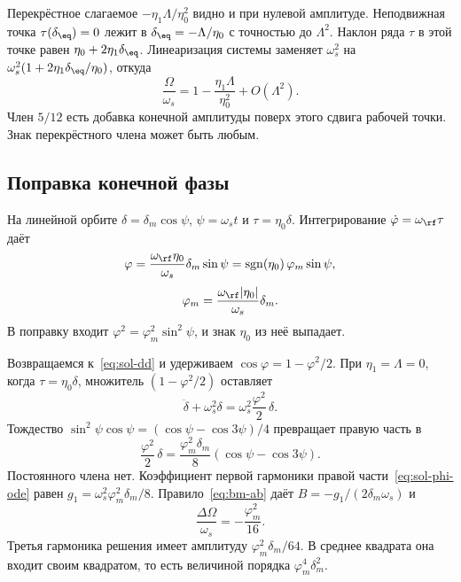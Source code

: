 Перекрёстное слагаемое $-\eta_1\Lambda/\eta_0^2$ видно и при нулевой амплитуде. Неподвижная точка $\tau(\delta_\eq)=0$ лежит в $\delta_\eq=-\Lambda/\eta_0$ с точностью до $\Lambda^2$. Наклон ряда $\tau$ в этой точке равен $\eta_0+2\eta_1\delta_\eq$. Линеаризация системы заменяет $\omega_s^2$ на $\omega_s^2(1+2\eta_1\delta_\eq/\eta_0)$, откуда
\begin{equation}
\label{eq:sol-cross}
\frac{\Omega}{\omega_s}
=1-\frac{\eta_1\Lambda}{\eta_0^2}+O(\Lambda^2).
\end{equation}
Член $5/12$ есть добавка конечной амплитуды поверх этого сдвига рабочей точки. Знак перекрёстного члена может быть любым.

\subsection{Поправка конечной фазы}
\label{sec:sol-phi}

На линейной орбите $\delta=\delta_m\cos\psi$, $\psi=\omega_s t$ и $\tau=\eta_0\delta$. Интегрирование $\dot\varphi=\omega_\rf\tau$ даёт
\begin{equation}
\label{eq:sol-phi}
\varphi
=\frac{\omega_\rf\eta_0}{\omega_s}\delta_m\sin\psi
=\operatorname{sgn}(\eta_0)\,\varphi_m\sin\psi,
\end{equation}
\begin{equation}
\label{eq:sol-phim}
\varphi_m
=\frac{\omega_\rf|\eta_0|}{\omega_s}\delta_m.
\end{equation}
В поправку входит $\varphi^2=\varphi_m^2\sin^2\psi$, и знак $\eta_0$ из неё выпадает.

Возвращаемся к~\eqref{eq:sol-dd} и удерживаем $\cos\varphi=1-\varphi^2/2$. При $\eta_1=\Lambda=0$, когда $\tau=\eta_0\delta$, множитель $(1-\varphi^2/2)$ оставляет
\begin{equation}
\label{eq:sol-phi-ode}
\ddot\delta+\omega_s^2\delta
=\omega_s^2\frac{\varphi^2}{2}\,\delta.
\end{equation}
Тождество $\sin^2\psi\cos\psi=(\cos\psi-\cos 3\psi)/4$ превращает правую часть в
\begin{equation}
\label{eq:sol-phi-fourier}
\frac{\varphi^2}{2}\,\delta
=\frac{\varphi_m^2\delta_m}{8}(\cos\psi-\cos 3\psi).
\end{equation}
Постоянного члена нет. Коэффициент первой гармоники правой части~\eqref{eq:sol-phi-ode} равен $g_1=\omega_s^2\varphi_m^2\delta_m/8$. Правило~\eqref{eq:bm-ab} даёт $B=-g_1/(2\delta_m\omega_s)$ и
\begin{equation}
\label{eq:sol-domega-phi}
\frac{\Delta\Omega}{\omega_s}=-\frac{\varphi_m^2}{16}.
\end{equation}
Третья гармоника решения имеет амплитуду $\varphi_m^2\delta_m/64$. В среднее квадрата она входит своим квадратом, то есть величиной порядка $\varphi_m^4\delta_m^2$.

